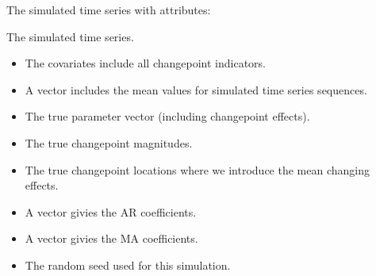\documentclass[a4paper]{book}
\begin{document}
%
\begin{Value}
The simulated time series with attributes:
\begin{ldescription}
\item[\code{\code{Z}}] The simulated time series.
\item[\code{Attributes}] 
\begin{itemize}

\item{}  The covariates include all changepoint indicators.
\item{}  A vector includes the mean values for simulated time series sequences.
\item{}  The true parameter vector (including changepoint effects).
\item{}  The true changepoint magnitudes.
\item{}  The true changepoint locations where we introduce the mean changing effects.
\item{}  A vector givies the AR coefficients.
\item{}  A vector givies the MA coefficients.
\item{}  The random seed used for this simulation.

\end{itemize}


\end{ldescription}
\end{Value}
%
\end{document}
